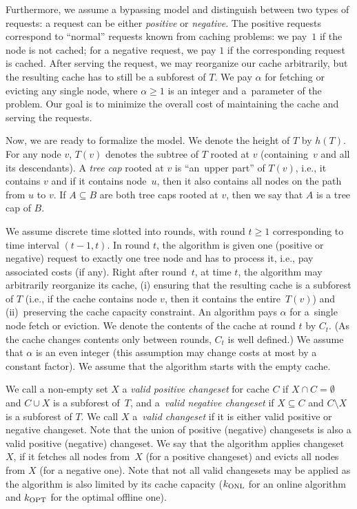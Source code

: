 Furthermore, we assume a bypassing model and distinguish between two types of
requests: a request can be either \emph{positive} or \emph{negative}. The
positive requests correspond to ``normal'' requests known from caching
problems: we pay~$1$ if the node is not cached; for a negative request, we pay
$1$ if the corresponding request is cached. After serving the request, we may
reorganize our cache arbitrarily, but the resulting cache has to still be a
subforest of $T$. We pay $\alpha$ for fetching or evicting any single node,
where $\alpha \geq 1$ is an integer and a~parameter of the problem. Our goal
is to minimize the overall cost of maintaining the cache and serving the
requests.

Now, we are ready to formalize the model.
We denote the height of $T$ by $h(T)$. For any node $v$, $T(v)$ denotes the
subtree of $T$ rooted at $v$ (containing~$v$ and all its descendants). A
\emph{tree cap} rooted at $v$ is ``an~upper part'' of $T(v)$, i.e., it
contains $v$ and if it contains node~$u$, then it also contains all nodes on
the path from $u$ to $v$. If $A \subseteq B$ are both tree caps rooted at $v$,
then we say that $A$ is a tree cap of $B$.

We assume discrete time slotted into rounds, with round $t \geq 1$
corresponding to time interval $(t-1,t)$. In round $t$, the algorithm is given
one (positive or negative) request to exactly one tree node and has to process
it, i.e., pay associated costs (if any). Right after round~$t$, at time $t$,
the algorithm may arbitrarily reorganize its cache, (i) ensuring that the
resulting cache is a subforest of $T$ (i.e., if the cache contains node $v$,
then it contains the entire~$T(v)$) and (ii)~preserving the cache capacity
constraint. An algorithm pays $\alpha$ for a~single node fetch or eviction. We
denote the contents of the cache at round $t$ by $C_t$. (As the cache changes
contents only between rounds, $C_t$ is well defined.) We assume that $\alpha$
is an even integer (this assumption may change costs at most by a constant
factor). We assume that the algorithm starts with the empty cache.

We call a non-empty set $X$ a \emph{valid positive changeset} for cache $C$ if
$X \cap C = \emptyset$ and $C \cup X$ is a subforest of~$T$, and a~\emph{valid
negative changeset} if $X \subseteq C$ and $C \setminus X$ is a subforest of
$T$. We call $X$ a~\emph{valid changeset} if it is either valid positive or
negative changeset. Note that the union of positive (negative) changesets is
also a valid positive (negative) changeset. We say that the algorithm applies
changeset~$X$, if it fetches all nodes from~$X$ (for a positive changeset) and
evicts all nodes from $X$ (for a negative one). Note that not all valid
changesets may be applied as the algorithm is also limited by its cache capacity
($k_\textnormal{ONL}$ for an online algorithm and $k_\textnormal{OPT}$ for the optimal offline one).

